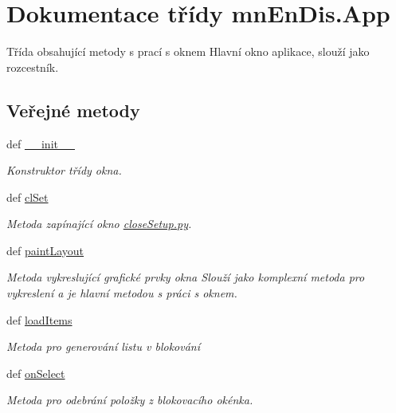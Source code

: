 \hypertarget{classmnEnDis_1_1App}{\section{Dokumentace třídy mn\-En\-Dis.\-App}
\label{d3/d4e/classmnEnDis_1_1App}
}


Třída obsahující metody s prací s oknem Hlavní okno aplikace, slouží jako rozcestník.  


\subsection*{Veřejné metody}
\begin{DoxyCompactItemize}
\item 
def \hyperlink{classmnEnDis_1_1App_a3ac75ba1fca4a08b0d67aa7e90955432}{\-\_\-\-\_\-init\-\_\-\-\_\-}
\begin{DoxyCompactList}\small\item\em Konstruktor třídy okna. \end{DoxyCompactList}\item 
def \hyperlink{classmnEnDis_1_1App_a4be4b410762f472fb88468fa0558477b}{cl\-Set}
\begin{DoxyCompactList}\small\item\em Metoda zapínající okno \hyperlink{closeSetup_8py}{close\-Setup.\-py}. \end{DoxyCompactList}\item 
def \hyperlink{classmnEnDis_1_1App_a93d7d009d63cf2e43b27e518a6c13a34}{paint\-Layout}
\begin{DoxyCompactList}\small\item\em Metoda vykreslující grafické prvky okna Slouží jako komplexní metoda pro vykreslení a je hlavní metodou s práci s oknem. \end{DoxyCompactList}\item 
def \hyperlink{classmnEnDis_1_1App_a8ad51ad767ffedec6efb20f08edf0c15}{load\-Items}
\begin{DoxyCompactList}\small\item\em Metoda pro generování listu v blokování \end{DoxyCompactList}\item 
def \hyperlink{classmnEnDis_1_1App_ad20f09e427dc61e92923f8d31328b354}{on\-Select}
\begin{DoxyCompactList}\small\item\em Metoda pro odebrání položky z blokovacího okénka. \end{DoxyCompactList}\item 

\end{DoxyCompactItemize}
